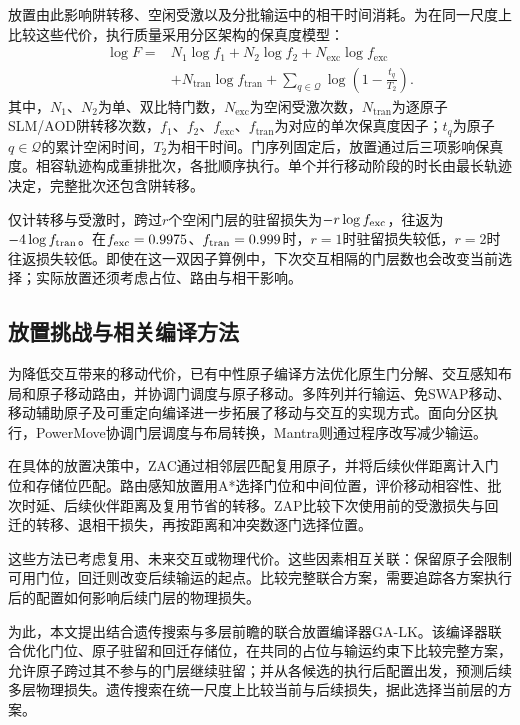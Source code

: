 放置由此影响阱转移、空闲受激以及分批输运中的相干时间消耗。为在同一尺度上比较这些代价，执行质量采用分区架构的保真度模型\cite{lin2025zac}：
\begin{equation}
\begin{aligned}
\log F={}&N_1\log f_1+N_2\log f_2
+N_{\mathrm{exc}}\log f_{\mathrm{exc}}\\
&+N_{\mathrm{tran}}\log f_{\mathrm{tran}}
+\sum_{q\in\mathcal Q}\log\left(1-\frac{t_q}{T_2}\right).
\end{aligned}
\label{eq:fidelity}
\end{equation}
其中，$N_1$、$N_2$为单、双比特门数，$N_{\mathrm{exc}}$为空闲受激次数，$N_{\mathrm{tran}}$为逐原子SLM/AOD阱转移次数，$f_1$、$f_2$、$f_{\mathrm{exc}}$、$f_{\mathrm{tran}}$为对应的单次保真度因子；$t_q$为原子$q\in\mathcal Q$的累计空闲时间，$T_2$为相干时间。门序列固定后，放置通过后三项影响保真度。相容轨迹构成重排批次，各批顺序执行。单个并行移动阶段的时长由最长轨迹决定\cite{stade2025routingaware}，完整批次还包含阱转移\cite{lin2025zac}。

\begin{samepage}
仅计转移与受激时，跨过$r$个空闲门层的驻留损失为$-r\log f_{\rm exc}$，往返为$-4\log f_{\rm tran}$。在$f_{\rm exc}=0.9975$、$f_{\rm tran}=0.999$时，$r=1$时驻留损失较低，$r=2$时往返损失较低。即使在这一双因子算例中，下次交互相隔的门层数也会改变当前选择；实际放置还须考虑占位、路由与相干影响。\par
\end{samepage}

\subsection{放置挑战与相关编译方法}

为降低交互带来的移动代价，已有中性原子编译方法优化原生门分解、交互感知布局和原子移动路由\cite{patel2022geyser,patel2023graphine,tan2022mapping,schmid2024hybrid}，并协调门调度与原子移动\cite{tan2024olsqdpqa,tan2025enola}。多阵列并行输运\cite{wang2024atomique}、免SWAP移动\cite{ludmir2024parallax}、移动辅助原子\cite{wang2024qpilot}及可重定向编译\cite{kirmemis2025weaver}进一步拓展了移动与交互的实现方式。面向分区执行，PowerMove协调门层调度与布局转换\cite{ruan2025powermove}，Mantra则通过程序改写减少输运\cite{jang2025mantra}。

在具体的放置决策中，ZAC通过相邻层匹配复用原子，并将后续伙伴距离计入门位和存储位匹配\cite{lin2025zac}。路由感知放置用A*选择门位和中间位置，评价移动相容性、批次时延、后续伙伴距离及复用节省的转移\cite{stade2025routingaware}。ZAP比较下次使用前的受激损失与回迁的转移、退相干损失，再按距离和冲突数逐门选择位置\cite{huang2026zap}。

这些方法已考虑复用、未来交互或物理代价。这些因素相互关联：保留原子会限制可用门位，回迁则改变后续输运的起点\cite{lin2025zac}。比较完整联合方案，需要追踪各方案执行后的配置如何影响后续门层的物理损失。

\label{sec:contributions}
为此，本文提出结合遗传搜索与多层前瞻的联合放置编译器GA-LK。该编译器联合优化门位、原子驻留和回迁存储位，在共同的占位与输运约束下比较完整方案，允许原子跨过其不参与的门层继续驻留；并从各候选的执行后配置出发，预测后续多层物理损失。遗传搜索在统一尺度上比较当前与后续损失，据此选择当前层的方案。
